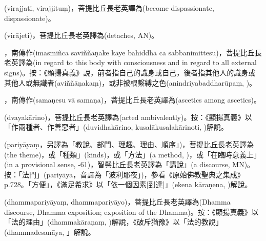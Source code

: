 \startitemgroup[noteitems]
\item{}(virajjati, virajjituṃ)，菩提比丘長老英譯為(become dispassionate, dispassionate)。
\item{}(virājeti)，菩提比丘長老英譯為(detaches, AN)。
\stopitemgroup

\startitemgroup[noteitems]
\item{}，南傳作(imasmiñca saviññāṇake kāye bahiddhā ca sabbanimittesu)，菩提比丘長老英譯為(in regard to this body with consciousness and in regard to all external signs)。按：《顯揚真義》說，前者指自己的識身或自己，後者指其他人的識身或其他人或無識者(aviññāṇakaṃ)，或非被根繫縛之色(anindriyabaddharūpaṃ, )。
\stopitemgroup

\startitemgroup[noteitems]
\item{}，南傳作(samaṇesu vā samaṇa)，菩提比丘長老英譯為(ascetics among ascetics)。
\stopitemgroup

\startitemgroup[noteitems]
\item{}(dvayakārino)，菩提比丘長老英譯為(acted ambivalently)。按：《顯揚真義》以「作兩種者、作善惡者」(duvidhakārino, kusalākusalakārinoti, )解說。
\stopitemgroup

\startitemgroup[noteitems]
\item{}(pariyāyaṃ，另譯為「教說、部門、理趣、理由、順序」)，菩提比丘長老英譯為(the theme)，或「種類」(kinds)，或「方法」(a method, )，或「在臨時意義上」(in a provisional sense, -61)，智髻比丘長老英譯為「講說」(a discourse, MN)。按：「法門」(pariyāya，音譯為「波利耶夜」)，參看《原始佛教聖典之集成》p.728。「方便」，《滿足希求》以「依一個因素[到達]」(ekena kāraṇena, )解說。
\item{}(dhammapariyāyaṃ, dhammapariyāyo)，菩提比丘長老英譯為(Dhamma discourse, Dhamma exposition; exposition of the Dhamma)。按：《顯揚真義》以「法的理由」(dhammakāraṇaṃ, )解說，《破斥猶豫》以「法的教說」(dhammadesanāya, 」解說。
\stopitemgroup

